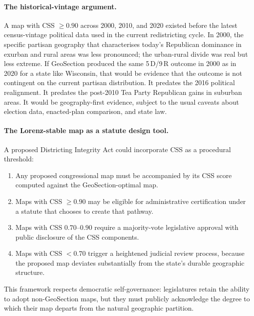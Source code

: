\paragraph{The historical-vintage argument.}
A map with CSS $\geq 0.90$ across 2000, 2010, and 2020 existed before the
latest census-vintage political data used in the current redistricting cycle.
In 2000, the specific partisan geography that characterises today's Republican
dominance in exurban and rural areas was less pronounced; the urban-rural
divide was real but less extreme.
If GeoSection produced the same 5\,D/9\,R outcome in 2000 as in 2020 for a
state like Wisconsin, that would be evidence that the outcome is not contingent
on the current partisan distribution.
It predates the 2016 political realignment.
It predates the post-2010 Tea Party Republican gains in suburban areas.
It would be geography-first evidence, subject to the usual caveats about
election data, enacted-plan comparison, and state law.

\paragraph{The Lorenz-stable map as a statute design tool.}
A proposed Districting Integrity Act could incorporate CSS as a procedural
threshold:
\begin{enumerate}
\item Any proposed congressional map must be accompanied by its CSS score
  computed against the GeoSection-optimal map.
\item Maps with CSS $\geq 0.90$ may be eligible for administrative
  certification under a statute that chooses to create that pathway.
\item Maps with CSS $0.70$--$0.90$ require a majority-vote legislative approval
  with public disclosure of the CSS components.
\item Maps with CSS $< 0.70$ trigger a heightened judicial review process,
  because the proposed map deviates substantially from the state's durable
  geographic structure.
\end{enumerate}

This framework respects democratic self-governance: legislatures retain the
ability to adopt non-GeoSection maps, but they must publicly acknowledge the
degree to which their map departs from the natural geographic partition.

